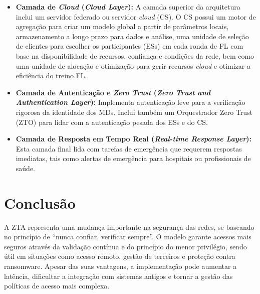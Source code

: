 \documentclass{llncs}
\begin{document}
\begin{itemize}
    \item \textbf{Camada de \textit{Cloud} (\textit{Cloud Layer}):} A camada superior da arquitetura inclui um servidor federado ou servidor \textit{cloud} (CS). O CS possui um motor de agregação para criar um modelo global a partir de parâmetros locais, armazenamento a longo prazo para dados e análise, uma unidade de seleção de clientes para escolher os participantes (ESs) em cada ronda de FL com base na disponibilidade de recursos, confiança e condições da rede, bem como uma unidade de alocação e otimização para gerir recursos \textit{cloud} e otimizar a eficiência do treino FL.
    
    \item \textbf{Camada de Autenticação e \textit{Zero Trust} (\textit{Zero Trust and Authentication Layer}):} Implementa autenticação leve para a verificação rigorosa da identidade dos MDs. Inclui também um Orquestrador Zero Trust (ZTO) para lidar com a autenticação pesada dos ESs e do CS.
    
    \item \textbf{Camada de Resposta em Tempo Real (\textit{Real-time Response Layer}):} Esta camada final lida com tarefas de emergência que requerem respostas imediatas, tais como alertas de emergência para hospitais ou profissionais de saúde.
\end{itemize}

\section{Conclusão}
A ZTA representa uma mudança importante na segurança das redes, se baseando no princípio de “nunca confiar, verificar sempre”. O modelo garante acessos mais seguros através da validação contínua e do princípio do menor privilégio, sendo útil em situações como acesso remoto, gestão de terceiros e proteção contra ransomware. Apesar das suas vantagens, a implementação pode aumentar a latência, dificultar a integração com sistemas antigos e tornar a gestão das políticas de acesso mais complexa.


\end{document}
